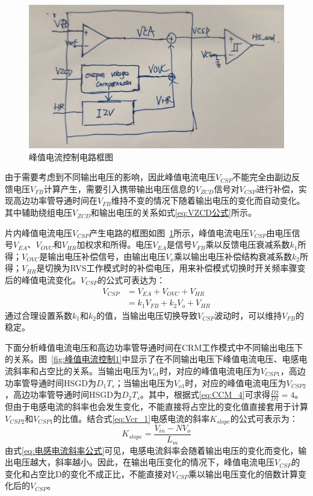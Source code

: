 \begin{figure}[htbp] 
    \centering
    \includegraphics[width=0.8\linewidth]{figures/峰值电流控制.jpg}
    \caption{峰值电流控制电路框图}
    \label{fig:峰值电流控制框图}
\end{figure}

由于需要考虑到不同输出电压的影响，因此峰值电流电压$V_{CSP}$不能完全由副边反馈电压$V_{FB}$计算产生，需要引入携带输出电压信息的$V_{ZCD}$信号对$V_{CSP}$进行补偿，实现高边功率管导通时间在$V_{FB}$维持不变的情况下随着输出电压的变化而自动变化。其中辅助绕组电压$V_{ZCD}$和输出电压的关系如式\eqref{eq:VZCD公式}所示。

片内峰值电流电压$V_{CSP}$产生电路的框图如图~\ref{fig:峰值电流控制框图}所示，峰值电流电压$V_{CSP}$由电压信号$V_{EA}$、$V_{OVC}$和$V_{HR}$加权求和所得。电压$V_{EA}$是信号$V_{FB}$乘以反馈电压衰减系数$k_1$所得；$V_{OVC}$是输出电压补偿信号，由输出电压$V_o$乘以输出电压补偿结构衰减系数$k_2$所得；$V_{HR}$是切换为RVS工作模式时的补偿电压，用来补偿模式切换时开关频率骤变后的峰值电流变化。$V_{CSP}$的公式可表达为：
\begin{align}
    \label{eq:VCSP公式1}
    V_{CSP} &= V_{EA} + V_{OVC} + V_{HR} \\ &= k_1 V_{FB} + k_2 V_o + V_{HR}  
\end{align}
通过合理设置系数$k_1$和$k_2$的值，当输出电压切换导致$V_{CSP}$波动时，可以维持$V_{FB}$的稳定。

下面分析峰值电流电压和高边功率管导通时间在CRM工作模式中不同输出电压下的关系。图~\ref{fig:峰值电流控制1}中显示了在不同输出电压下峰值电流电压、电感电流斜率和占空比的关系。当输出电压为$V_{o1}$时，对应的峰值电流电压为$V_{CSP1}$，高边功率管导通时间HSGD为$D_1T_s$；当输出电压为$V_{o1}$时，对应的峰值电流电压为$V_{CSP2}$，高边功率管导通时间HSGD为$D_2T_s$。其中，根据式\eqref{eq:CCM_4}可求得$\frac{D2}{D1} = 4$。但由于电感电流的斜率也会发生变化，不能直接将占空比的变化值直接套用于计算$V_{CSP2}$和$V_{CSP1}$的比值。结合式\eqref{eq:Vcr_1}电感电流的斜率$K_{slope}$的公式可表示为：
\begin{equation}
    \label{eq:电感电流斜率公式}
    K_{slope} = \frac{V_{in} - N V_o}{L_m}
\end{equation}
由式\eqref{eq:电感电流斜率公式}可见，电感电流斜率会随着输出电压的变化而变化，输出电压越大，斜率越小。因此，在输出电压变化的情况下，峰值电流电压$V_{CSP}$的变化和占空比D的变化不成正比，不能直接对$V_{CSP}$乘以输出电压变化的倍数计算变化后的$V_{CSP}$。

